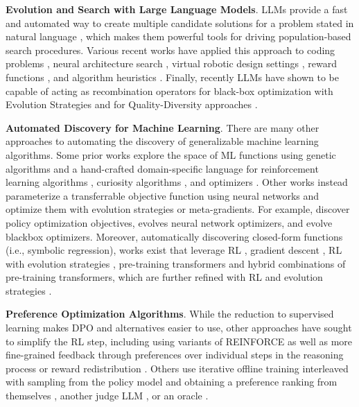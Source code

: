 \documentclass{article}
\theoremstyle{plain}
\theoremstyle{definition}
\theoremstyle{remark}
\begin{document}
\textbf{Evolution and Search with Large Language Models}. LLMs provide a fast and automated way to create multiple candidate solutions for a problem stated in natural language \citep{song2024position}, which makes them powerful tools for driving population-based search procedures. Various recent works have applied this approach to coding problems \citep{romera2024mathematical}, neural architecture search \citep{chen2024evoprompting,holt2024learning}, virtual robotic design settings \citep{lehman2023evolution}, reward functions \citep{ma2023eureka, yu2023language}, and algorithm heuristics \citep{liu2024evolution}. Finally, recently LLMs have shown to be capable of acting as recombination operators for black-box optimization with Evolution Strategies \citep{lange2024large} and for Quality-Diversity approaches \citep{lim2024large}.

\textbf{Automated Discovery for Machine Learning}. 
There are many other approaches to automating the discovery of generalizable machine learning algorithms. Some prior works explore the space of ML functions using genetic algorithms and a hand-crafted domain-specific language for reinforcement learning algorithms \citep{co2021evolving}, curiosity algorithms \citep{alet2020meta}, and optimizers \citep{chen2024symbolic}. Other works instead parameterize a transferrable objective function using neural networks and optimize them with evolution strategies or meta-gradients. For example, \citet{lu2022discovered, jackson2024discovering, houthooft2018evolved, alfano2024meta, kirsch2019improving, oh2020discovering, jackson2024groove} discover policy optimization objectives, \citet{metz2022velo} evolves neural network optimizers, and \citet{lange2023discovering_es, lange2023discovering_ga} evolve blackbox optimizers. Moreover, automatically discovering closed-form functions (i.e., symbolic regression), works exist that leverage RL \citep{petersen2020deep}, gradient descent \citep{kacprzyk2024ode}, RL with evolution strategies \citep{mundhenk2021symbolic}, pre-training transformers \citep{biggio2021neural} and hybrid combinations of pre-training transformers, which are further refined with RL and evolution strategies \citep{holt2023deep}.

\textbf{Preference Optimization Algorithms}. %
While the reduction to supervised learning makes DPO and alternatives easier to use, other approaches have sought to simplify the RL step, including using variants of REINFORCE \citep{ahmadian2024back,team2024gemma} as well as more fine-grained feedback
\citep{wu2024fine} through preferences over individual steps in the reasoning process \citep{uesato2022solving,lightman2023let} or reward redistribution \citep{chan2024dense}. Others use iterative offline training interleaved with sampling from the policy model and obtaining a preference ranking from themselves \citep{xu2023some}, another judge LLM \citep{guo2024direct}, or an oracle \citep{swamy2024minimaximalist}. 
\end{document}

